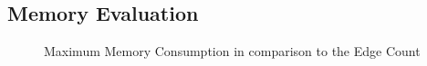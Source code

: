 \documentclass[../draft.tex]{subfiles}
\begin{document}
    \FloatBarrier
    \subsection{Memory Evaluation}\label{s:memex}


    \begin{figure}[ht]
        \begin{subfigure}[b]{\textwidth}
            \centering
            \begin{subfigure}[]{0.45\textwidth}
                \centering
                \resizebox{\columnwidth}{!}{
                    
                }
            \end{subfigure}
            \qquad
            \begin{subfigure}[]{0.45\textwidth}
                \centering
                \resizebox{\columnwidth}{!}{
                    
                }
            \end{subfigure}
        \end{subfigure}
        \caption{Maximum Memory Consumption in comparison to the Edge Count}
        \label{f:maxmemedges}
    \end{figure}
\end{document}

